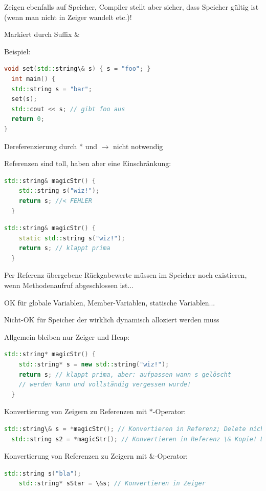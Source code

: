 \documentclass[10pt]{article}
\begin{document}
\begin{itemize*}
  \item Zeigen ebenfalls auf Speicher, Compiler stellt aber sicher, dass Speicher gültig ist (wenn man nicht in Zeiger wandelt etc.)!
  \item Markiert durch Suffix \&
  \item Beispiel:
  \begin{lstlisting}[language=C++]
void set(std::string\& s) { s = "foo"; }
  int main() {
  std::string s = "bar";
  set(s);
  std::cout << s; // gibt foo aus
  return 0;
}
\end{lstlisting}
  \item Dereferenzierung durch * und $\rightarrow$ nicht notwendig
  \item Referenzen sind toll, haben aber eine Einschränkung:
  \begin{lstlisting}[language=C++]
  std::string& magicStr() {
    std::string s("wiz!");
    return s; //< FEHLER
  }
  \end{lstlisting}
  \begin{lstlisting}[language=C++]
  std::string& magicStr() {
    static std::string s("wiz!");
    return s; // klappt prima
  }
\end{lstlisting}
  \item Per Referenz übergebene Rückgabewerte müssen im Speicher noch existieren, wenn Methodenaufruf abgeschlossen ist...
  \begin{itemize*}
    \item OK für globale Variablen, Member-Variablen, statische Variablen...
    \item Nicht-OK für Speicher der wirklich dynamisch alloziert werden muss
  \end{itemize*}
  \item Allgemein bleiben nur Zeiger und Heap:
  \begin{lstlisting}[language=C++]
  std::string* magicStr() {
    std::string* s = new std::string("wiz!");
    return s; // klappt prima, aber: aufpassen wann s gelöscht
    // werden kann und vollständig vergessen wurde!
  }
  \end{lstlisting}
  \item Konvertierung von Zeigern zu Referenzen mit $*$-Operator:
  \begin{lstlisting}[language=C++]
  std::string\& s = *magicStr(); // Konvertieren in Referenz; Delete nicht mehr möglich
  std::string s2 = *magicStr(); // Konvertieren in Referenz \& Kopie! Delete nicht direkt möglich
  \end{lstlisting}
  \item Konvertierung von Referenzen zu Zeigern mit $\&$-Operator:
  \begin{lstlisting}[language=C++]
    std::string s("bla");
    std::string* sStar = \&s; // Konvertieren in Zeiger
  \end{lstlisting}
\end{itemize*}
\end{document}
